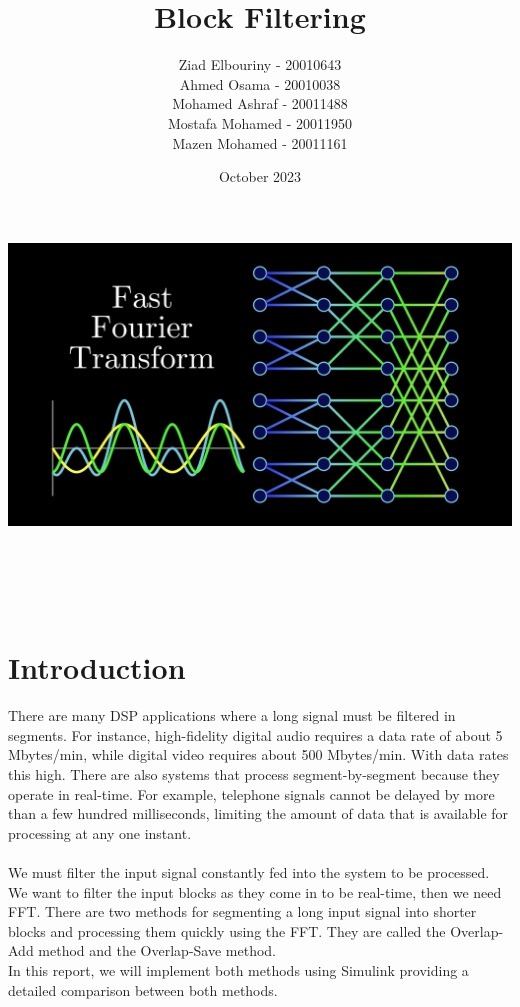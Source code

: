 \documentclass[12pt,a4paper]{article}
\title{\textbf{Block Filtering}}
\author{Ziad Elbouriny - 20010643\\
Ahmed Osama - 20010038\\
Mohamed Ashraf - 20011488\\
Mostafa Mohamed - 20011950\\
Mazen Mohamed - 20011161 }
\date{October 2023}
\begin{document}
\maketitle

\includegraphics[width=\textwidth]{Photos/maxresdefault.jpg}{\\ \\ \\ \\ \\}
\addtolength{\topmargin}{-60pt}
\addtolength{\textheight}{120pt}
\section*{Introduction}
\large{
There are many DSP applications where a long signal must be filtered in segments. For instance, high-fidelity digital audio requires a data rate of about 5 Mbytes/min, while digital video requires about 500 Mbytes/min. With data rates this high. There are also systems that process segment-by-segment because they operate in real-time. For example, telephone signals cannot be delayed by more than a few hundred milliseconds, limiting the amount of data that is available for processing at any one instant.\\ \\
We must filter the input signal constantly fed into the system to be processed. We want to filter the input blocks as they come
in to be real-time, then we need FFT. There are two methods for segmenting a long input signal into shorter blocks and processing them quickly using the FFT. They are called the Overlap-Add method and the Overlap-Save method.\\

In this report, we will implement both methods using Simulink providing a detailed comparison between both methods.}
\end{document}
